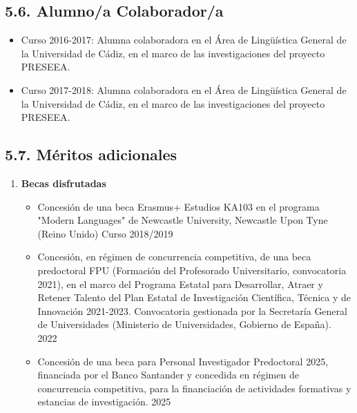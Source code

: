 \begin{enumerate}[label=\alph*)]
\subsection*{5.6. Alumno/a Colaborador/a}

    \begin{itemize}
      \item Curso 2016-2017: Alumna colaboradora en el Área de Lingüística General de la Universidad de Cádiz, en el marco de las investigaciones del proyecto PRESEEA.
      \item Curso 2017-2018: Alumna colaboradora en el Área de Lingüística General de la Universidad de Cádiz, en el marco de las investigaciones del proyecto PRESEEA.
\end{itemize}

\subsection*{5.7. Méritos adicionales}

\begin{enumerate}[label=\alph*)]
\item \textbf{Becas disfrutadas}
\begin{itemize}
    \item Concesión de una beca Erasmus+ Estudios KA103 en el programa "Modern Languages" de Newcastle University, Newcastle Upon Tyne (Reino Unido) \hfill Curso 2018/2019
    \item Concesión, en régimen de concurrencia competitiva, de una beca predoctoral FPU (Formación del Profesorado Universitario, convocatoria 2021), en el marco del Programa Estatal para Desarrollar, Atraer y Retener Talento del Plan Estatal de Investigación Científica, Técnica y de Innovación 2021-2023. Convocatoria gestionada por la Secretaría General de Universidades (Ministerio de Universidades, Gobierno de España). \hfill 2022
    \item Concesión de una beca para Personal Investigador Predoctoral 2025, financiada por el Banco Santander y concedida en régimen de concurrencia competitiva, para la financiación de actividades formativas y estancias de investigación. \hfill 2025
\end{itemize}


\end{enumerate}
\end{enumerate}
